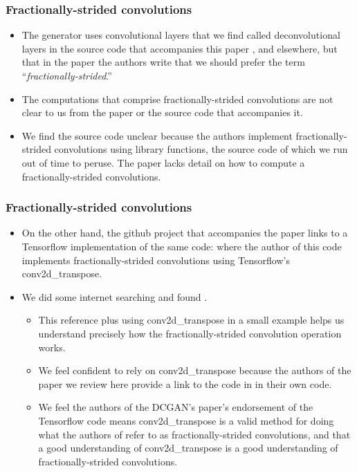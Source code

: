 \documentclass{beamer}
\begin{document}


\begin{frame}[allowframebreaks]
\frametitle{Fractionally-strided convolutions}
\begin{itemize}

\item The generator uses convolutional layers that we find called
deconvolutional layers in the source code that accompanies this paper
\cite{dcganCode}, and elsewhere, but that in the paper the authors write that
we should prefer the term ``\textit{fractionally-strided}.''  

\item The computations that comprise fractionally-strided convolutions are not
clear to us from the paper or the source code that accompanies it.  

\item We find the source code unclear because the authors implement
  fractionally-strided convolutions using library functions, the source code of
  which we run out of time to peruse.  The paper lacks detail on how to compute a
  fractionally-strided convolutions.
\end{itemize}
\end{frame}


\begin{frame}[allowframebreaks]
\frametitle{Fractionally-strided convolutions}
\begin{itemize} 
  \item On the other hand, the github project \cite{dcganCode}
  that accompanies the paper \cite{repLearnDcgan} links to a Tensorflow
  implementation of the same code: \cite{dcganTf} where the author of this code
  implements fractionally-strided convolutions using Tensorflow's
  conv2d\_transpose.  
    
  \item We did some internet searching and found \cite{convArith}.
  \begin{itemize} 
    
  \item This reference plus using conv2d\_transpose in a small
      example helps us understand precisely how the fractionally-strided convolution
      operation works.  
    
      \item We feel confident to rely on conv2d\_transpose because
      the authors of the paper \cite{repLearnDcgan} we review here provide a link to
      the code in \cite{dcganTf} in their own code. 
          
      \item We feel the authors of the DCGAN's paper's endorsement of the
      Tensorflow code means conv2d\_transpose is a valid method for doing what the
      authors of \cite{repLearnDcgan} refer to as fractionally-strided convolutions,
      and that a good understanding of conv2d\_transpose is a good understanding of
      fractionally-strided convolutions.  
   \end{itemize} 
\end{itemize}
\end{frame}
\end{document}
